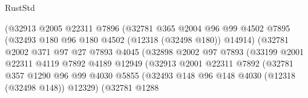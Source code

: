 \begin{lexlean}{RustStd}
\begin{coremodule}
                                    (@32913
                                      @2005
                                      @22311
                                      @7896
                                      (@32781
                                        @365
                                        @2004
                                        @96
                                        @99
                                        @4502
                                        @7895
                                        (@32493 @180 @96 @180 @4502 (@12318 (@32498 @180)) @14914)
                                        (@32781
                                          @2002
                                          @371
                                          @97
                                          @27
                                          @7893
                                          @4045
                                          (@32898
                                            @2002
                                            @97
                                            @7893
                                            (@33199
                                              @2001
                                              @22311
                                              @4119
                                              @7892
                                              @4189
                                              @12949
                                              (@32913
                                                @2001
                                                @22311
                                                @7892
                                                (@32781
                                                  @357
                                                  @1290
                                                  @96
                                                  @99
                                                  @4030
                                                  @5855
                                                  (@32493
                                                    @148
                                                    @96
                                                    @148
                                                    @4030
                                                    (@12318 (@32498 @148))
                                                    @12329)
                                                  (@32781
                                                    @1288

\end{coremodule}
\end{lexlean}
